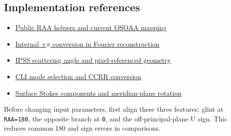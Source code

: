 \subsection{Implementation references}
\label{sec:auto:01_concepts_geometry:7.1}
\begin{itemize}
\item \href{https://github.com/brtnt/OCRT/blob/54861c68e35ec5aaa3938fad53e93dc2dfa7eb1d/code/OCRT_C/src/rt_raa_convention.h}{Public RAA helpers and current OSOAA mapping}
\item \href{https://github.com/brtnt/OCRT/blob/54861c68e35ec5aaa3938fad53e93dc2dfa7eb1d/code/OCRT_C/src/rt_fourier.c}{Internal +\ensuremath{\pi} conversion in Fourier reconstruction}
\item \href{https://github.com/brtnt/OCRT/blob/54861c68e35ec5aaa3938fad53e93dc2dfa7eb1d/code/OCRT_C/src/rt_ipss.c}{IPSS scattering angle and pixel-referenced geometry}
\item \href{https://github.com/brtnt/OCRT/blob/54861c68e35ec5aaa3938fad53e93dc2dfa7eb1d/code/OCRT_C/src/main.c}{CLI mode selection and CCRR conversion}
\item \href{https://github.com/brtnt/OCRT/blob/54861c68e35ec5aaa3938fad53e93dc2dfa7eb1d/code/OCRT_C/src/shared/surface.c}{Surface Stokes components and meridian-plane rotation}
\end{itemize}

Before changing input parameters, first align these three features: glint at \texttt{RAA=\allowbreak{}180\textdegree{}}, the opposite branch at \texttt{0\textdegree{}}, and the off-principal-plane U sign. This reduces common 180\textdegree{} and sign errors in comparisons.

